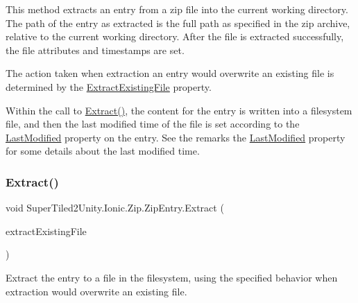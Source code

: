 This method extracts an entry from a zip file into the current working directory. The path of the entry as extracted is the full path as specified in the zip archive, relative to the current working directory. After the file is extracted successfully, the file attributes and timestamps are set. 

The action taken when extraction an entry would overwrite an existing file is determined by the \mbox{\hyperlink{class_super_tiled2_unity_1_1_ionic_1_1_zip_1_1_zip_entry_ad1ab903c29b91edb82e7c6a9768552dd}{Extract\+Existing\+File}} property. 

Within the call to {\ttfamily \mbox{\hyperlink{class_super_tiled2_unity_1_1_ionic_1_1_zip_1_1_zip_entry_a9d65543aadd23e47e188175412891b42}{Extract()}}}, the content for the entry is written into a filesystem file, and then the last modified time of the file is set according to the \mbox{\hyperlink{class_super_tiled2_unity_1_1_ionic_1_1_zip_1_1_zip_entry_acd1234fd27c216b59c166c2b96aba3dd}{Last\+Modified}} property on the entry. See the remarks the \mbox{\hyperlink{class_super_tiled2_unity_1_1_ionic_1_1_zip_1_1_zip_entry_acd1234fd27c216b59c166c2b96aba3dd}{Last\+Modified}} property for some details about the last modified time. \mbox{\label{class_super_tiled2_unity_1_1_ionic_1_1_zip_1_1_zip_entry_a0c740ca64fe50c0851e27d1324893ab9}} 
\subsubsection{\texorpdfstring{Extract()}{Extract()}\hspace{0.1cm}{\footnotesize\ttfamily [2/5]}}
{\footnotesize\ttfamily void Super\+Tiled2\+Unity.\+Ionic.\+Zip.\+Zip\+Entry.\+Extract (\begin{DoxyParamCaption}\item[{\mbox{\hyperlink{namespace_super_tiled2_unity_1_1_ionic_1_1_zip_a3f8db7242d746d36b45114257b4fe4c0}{Extract\+Existing\+File\+Action}}}]{extract\+Existing\+File }\end{DoxyParamCaption})}



Extract the entry to a file in the filesystem, using the specified behavior when extraction would overwrite an existing file. 


